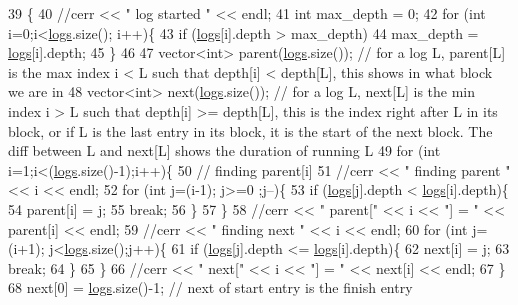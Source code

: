 \begin{DoxyCode}
39                 \{
40   \textcolor{comment}{//cerr << " log started " << endl;}
41   \textcolor{keywordtype}{int} max\_depth = 0;
42   \textcolor{keywordflow}{for} (\textcolor{keywordtype}{int} i=0;i<\hyperlink{classlogger_a46e89697a97bc41a90ec78763bfe4d39}{logs}.size(); i++)\{
43     \textcolor{keywordflow}{if} (\hyperlink{classlogger_a46e89697a97bc41a90ec78763bfe4d39}{logs}[i].depth > max\_depth)
44       max\_depth = \hyperlink{classlogger_a46e89697a97bc41a90ec78763bfe4d39}{logs}[i].depth;
45   \}
46 
47   vector<int> parent(\hyperlink{classlogger_a46e89697a97bc41a90ec78763bfe4d39}{logs}.size()); \textcolor{comment}{// for a log L, parent[L] is the max index i < L such that depth[i]
       < depth[L], this shows in what block we are in}
48   vector<int> next(\hyperlink{classlogger_a46e89697a97bc41a90ec78763bfe4d39}{logs}.size()); \textcolor{comment}{// for a log L, next[L] is the min index i > L such that depth[i] >=
       depth[L], this is the index right after L in its block, or if L is the last entry in its block, it is the
       start of the next block. The diff between L and next[L] shows the duration of running L}
49   \textcolor{keywordflow}{for} (\textcolor{keywordtype}{int} i=1;i<(\hyperlink{classlogger_a46e89697a97bc41a90ec78763bfe4d39}{logs}.size()-1);i++)\{
50     \textcolor{comment}{// finding parent[i]}
51     \textcolor{comment}{//cerr << " finding parent " << i << endl;}
52     \textcolor{keywordflow}{for} (\textcolor{keywordtype}{int} j=(i-1); j>=0 ;j--)\{
53       \textcolor{keywordflow}{if} (\hyperlink{classlogger_a46e89697a97bc41a90ec78763bfe4d39}{logs}[j].depth < \hyperlink{classlogger_a46e89697a97bc41a90ec78763bfe4d39}{logs}[i].depth)\{
54         parent[i] = j;
55         \textcolor{keywordflow}{break};
56       \}
57     \}
58     \textcolor{comment}{//cerr << " parent[" << i << "] = " << parent[i] << endl;}
59     \textcolor{comment}{//cerr << " finding next " << i << endl;}
60     \textcolor{keywordflow}{for} (\textcolor{keywordtype}{int} j=(i+1); j<\hyperlink{classlogger_a46e89697a97bc41a90ec78763bfe4d39}{logs}.size();j++)\{
61       \textcolor{keywordflow}{if} (\hyperlink{classlogger_a46e89697a97bc41a90ec78763bfe4d39}{logs}[j].depth <= \hyperlink{classlogger_a46e89697a97bc41a90ec78763bfe4d39}{logs}[i].depth)\{
62         next[i] = j;
63         \textcolor{keywordflow}{break};
64       \}
65     \}
66     \textcolor{comment}{//cerr << " next[" << i << "] = " << next[i] << endl;}
67   \}
68   next[0] = \hyperlink{classlogger_a46e89697a97bc41a90ec78763bfe4d39}{logs}.size()-1; \textcolor{comment}{// next of start entry is the finish entry}

\end{DoxyCode}
